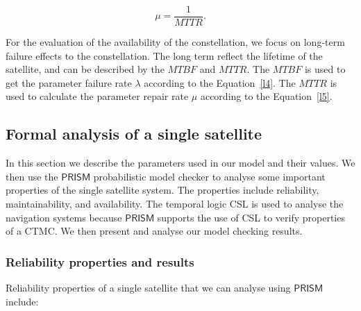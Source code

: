 \documentclass[preprint,12pt]{qrei}
\begin{document}
\begin{equation}
\mu=\frac{1}{MTTR}.
\label{l5}
\end{equation}

For the evaluation of the availability of the constellation, we focus on long-term failure effects to the constellation. The long term reflect the lifetime of the satellite, and can be described by the $MTBF$ and $MTTR$. The $MTBF$ is used to get the parameter failure rate ${\lambda}$ according to the Equation~\ref{l4}. The $MTTR$ is used to calculate the parameter repair rate ${\mu}$ according to the Equation~\ref{l5}.


\subsection{Formal analysis of a single satellite}

In this section we describe the parameters used in our model and their values. We then use the $\mathsf{PRISM}$ probabilistic model checker to analyse some important properties of the single satellite system. The properties include reliability, maintainability, and availability. The temporal logic CSL is used to analyse the navigation systems because $\mathsf{PRISM}$ supports the use of CSL to verify properties of a CTMC. We then present and analyse our model checking results.

\subsubsection{Reliability properties and results}

Reliability properties of a single satellite that we can analyse using $\mathsf{PRISM}$ include:
\end{document}
